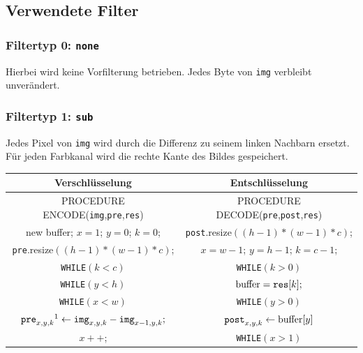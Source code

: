\documentclass[a4paper,12pt]{article}
\begin{document}
\subsection{Verwendete Filter}
\subsubsection{Filtertyp 0: {\tt{none}}}
Hierbei wird keine Vorfilterung betrieben. Jedes Byte von {\tt{img}} verbleibt unverändert.

\subsubsection{Filtertyp 1: {\tt{sub}}}
\begin{minipage}[h]{.6\textwidth}
Jedes Pixel von {\tt{img}} wird durch die Differenz zu seinem linken Nachbarn ersetzt. Für jeden Farbkanal wird die rechte Kante des Bildes gespeichert.
\vspace{1.5cm}
\end{minipage}
\hfill
\begin{minipage}[h]{.4\textwidth}
\begin{flushright}
\end{flushright}
\end{minipage}
\par
\vspace{1cm}
\begin{tabular}{c|c}
Verschlüsselung & Entschlüsselung
\\
\hline
PROCEDURE ENCODE({\tt{img}},{\tt{pre}},{\tt{res}}) & PROCEDURE DECODE({\tt{pre}},{\tt{post}},{\tt{res}})
\\
new buffer; $x=1$; $y=0$; $k=0$; & {\tt{post}}.resize$((h-1)*(w-1)*c)$;
\\
{\tt{pre}}.resize$((h-1)*(w-1)*c)$; & $x=w-1$; $y=h-1$; $k=c-1$;
\\
{\tt{WHILE}}$(k < c)$ &                  {\tt{WHILE}}$(k > 0)$
\\
{\tt{WHILE}}$(y < h)$ &               $\text{buffer} = \text{{\tt{res}}}[k];$
\\
{\tt{WHILE}}$(x < w)$ &              {\tt{WHILE}}$(y>0)$
\\
$\text{{\tt{pre}}}_{x,y,k}\footnotemark\leftarrow \text{{\tt{img}}}_{x,y,k} - \text{{\tt{img}}}_{x-1,y,k};$ &  $\text{{\tt{post}}}_{x,y,k}\leftarrow \text{buffer}[y]$
\\
$x++$; & {\tt{WHILE}}$(x>1)$
\end{tabular}
\end{document}
